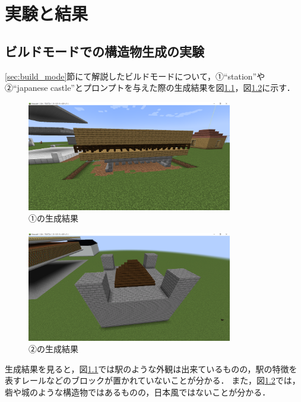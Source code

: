 \chapter{実験と結果}	%
\thispagestyle{plain}   %

\section{ビルドモードでの構造物生成の実験}\label{sec:build_mode_generate}
\ref{sec:build_mode}節にて解説したビルドモードについて，①``station''や②``japanese castle''とプロンプトを与えた際の生成結果を図\ref{fig:station1}，図\ref{fig:j_castle1}に示す．
\begin{figure}[H]
    \centering
    \includegraphics[width=0.8\textwidth]{fig/station1.png}
    \caption{①の生成結果}
    \label{fig:station1}
\end{figure}

\begin{figure}[H]
    \centering
    \includegraphics[width=0.8\textwidth]{fig/j_castle1.png}
    \caption{②の生成結果}
    \label{fig:j_castle1}
\end{figure}

生成結果を見ると，図\ref{fig:station1}では駅のような外観は出来ているものの，駅の特徴を表すレールなどのブロックが置かれていないことが分かる．
また，図\ref{fig:j_castle1}では，砦や城のような構造物ではあるものの，日本風ではないことが分かる．

